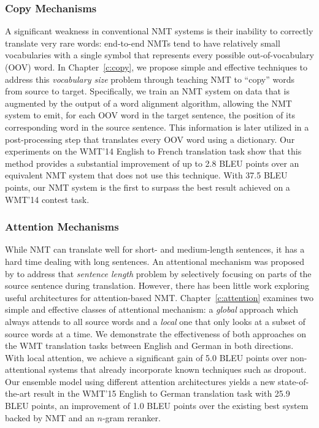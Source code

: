 \subsubsection*{Copy Mechanisms} 
A significant weakness in conventional NMT 
systems is their inability to correctly translate very rare words:  
end-to-end NMTs tend to have relatively small vocabularies with a single
\unk{} symbol that represents every possible out-of-vocabulary (OOV) word. In
Chapter~\ref{c:copy}, we propose simple and effective techniques to address this
{\it vocabulary size} problem through teaching NMT to ``copy'' words from source to
target. Specifically, we train an NMT system on data that is augmented by the output of a word 
alignment algorithm, allowing the NMT system to emit, for each OOV word
in the target sentence, the position of its corresponding word in the source sentence.
This information is later utilized in a
post-processing step that translates every OOV word using a dictionary.  Our
experiments on the WMT'14 English to French translation task show that this 
method provides a substantial improvement of up to 2.8 BLEU points over an
equivalent NMT system that does not use this technique. 
With 37.5 BLEU points, our NMT system is the first to surpass 
the best result achieved on a WMT'14 contest task.

\subsubsection{Attention Mechanisms} 
While NMT can translate well for short- and medium-length sentences, it 
has a hard time dealing with long sentences.
An attentional mechanism was proposed by  to address that {\it
sentence length} problem by
selectively focusing on parts of the source sentence during translation. However,
there has been little work exploring useful architectures for attention-based
NMT. Chapter~\ref{c:attention} examines two simple and effective classes of attentional
mechanism: a {\it global} approach which always attends to all source words and
a {\it local} one that only looks at a subset of source words at a time. 
We demonstrate the effectiveness of both approaches on the WMT translation
tasks between English and German in both directions. With local
attention, we achieve a significant gain of 5.0 BLEU points over
non-attentional systems that 
already incorporate known techniques such as dropout. Our ensemble 
model using different attention architectures yields a new
state-of-the-art result in the WMT'15 English to German
translation task with 25.9 BLEU points, an improvement of 1.0 BLEU points over the existing
best system backed by NMT and an $n$-gram reranker.

